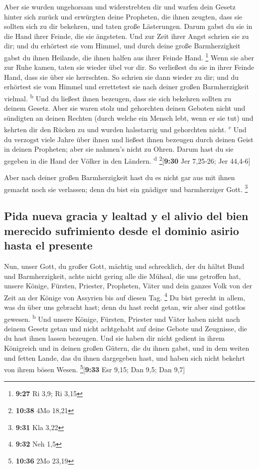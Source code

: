  Aber sie wurden ungehorsam und widerstrebten dir und
warfen dein Gesetz hinter sich zurück und erwürgten deine Propheten, die
ihnen zeugten, dass sie sollten sich zu dir bekehren, und taten große
Lästerungen.  Darum gabst du sie in die Hand ihrer
Feinde, die sie ängsteten. Und zur Zeit ihrer Angst schrien sie zu dir;
und du erhörtest sie vom Himmel, und durch deine große Barmherzigkeit
gabst du ihnen Heilande, die ihnen halfen aus ihrer Feinde Hand.
\footnote{\textbf{9:27} Ri 3,9; Ri 3,15}  Wenn sie aber
zur Ruhe kamen, taten sie wieder übel vor dir. So verließest du sie in
ihrer Feinde Hand, dass sie über sie herrschten. So schrien sie dann
wieder zu dir; und du erhörtest sie vom Himmel und errettetest sie nach
deiner großen Barmherzigkeit vielmal. \textsuperscript{b}
 Und du ließest ihnen bezeugen, dass sie sich bekehren
sollten zu deinem Gesetz. Aber sie waren stolz und gehorchten deinen
Geboten nicht und sündigten an deinen Rechten (durch welche ein Mensch
lebt, wenn er sie tut) und kehrten dir den Rücken zu und wurden
halsstarrig und gehorchten nicht. \textsuperscript{c} 
Und du verzogst viele Jahre über ihnen und ließest ihnen bezeugen durch
deinen Geist in deinen Propheten; aber sie nahmen's nicht zu Ohren.
Darum hast du sie gegeben in die Hand der Völker in den Ländern.
\textsuperscript{d} \footnote{\textbf{10:38} 4Mo 18,21}{[}\textbf{9:30}
Jer 7,25-26; Jer 44,4-6{]}

 Aber nach deiner großen Barmherzigkeit hast du es nicht
gar aus mit ihnen gemacht noch sie verlassen; denn du bist ein gnädiger
und barmherziger Gott. \footnote{\textbf{9:31} Kla 3,22}

\hypertarget{pida-nueva-gracia-y-lealtad-y-el-alivio-del-bien-merecido-sufrimiento-desde-el-dominio-asirio-hasta-el-presente}{%
\subsection{Pida nueva gracia y lealtad y el alivio del bien merecido
sufrimiento desde el dominio asirio hasta el
presente}\label{pida-nueva-gracia-y-lealtad-y-el-alivio-del-bien-merecido-sufrimiento-desde-el-dominio-asirio-hasta-el-presente}}

 Nun, unser Gott, du großer Gott, mächtig und
schrecklich, der du hältst Bund und Barmherzigkeit, achte nicht gering
alle die Mühsal, die uns getroffen hat, unsere Könige, Fürsten,
Priester, Propheten, Väter und dein ganzes Volk von der Zeit an der
Könige von Assyrien bis auf diesen Tag. \footnote{\textbf{9:32} Neh 1,5}
 Du bist gerecht in allem, was du über uns gebracht hast;
denn du hast recht getan, wir aber sind gottlos gewesen.
\textsuperscript{b}  Und unsere Könige, Fürsten, Priester
und Väter haben nicht nach deinem Gesetz getan und nicht achtgehabt auf
deine Gebote und Zeugnisse, die du hast ihnen lassen bezeugen.
 Und sie haben dir nicht gedient in ihrem Königreich und
in deinen großen Gütern, die du ihnen gabst, und in dem weiten und
fetten Lande, das du ihnen dargegeben hast, und haben sich nicht bekehrt
von ihrem bösen Wesen. \footnote{\textbf{10:36} 2Mo 23,19}{[}\textbf{9:33}
Esr 9,15; Dan 9,5; Dan 9,7{]}

